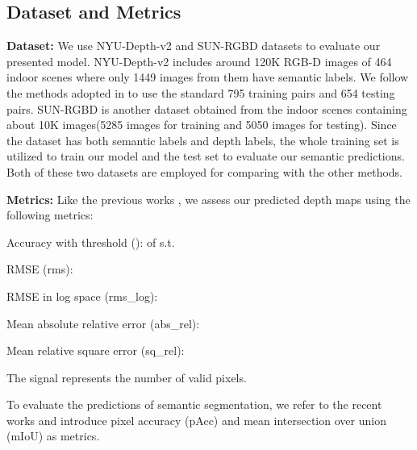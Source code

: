 \documentclass[sn-mathphys]{sn-jnl}
\theoremstyle{thmstyleone}\newtheorem{theorem}{Theorem}\newtheorem{proposition}[theorem]{Proposition}
\theoremstyle{thmstyletwo}\newtheorem{example}{Example}\newtheorem{remark}{Remark}
\theoremstyle{thmstylethree}\newtheorem{definition}{Definition}\usepackage[numbers,sort&compress]{natbib}
\begin{document}
\subsection{Dataset and Metrics}
\textbf{Dataset:} We use NYU-Depth-v2 \cite{Silberman_2012} and SUN-RGBD \cite{Song_2015} datasets to evaluate our presented model. NYU-Depth-v2 includes around 120K RGB-D images of 464 indoor scenes where only 1449 images from them have semantic labels. We follow the methods adopted in \cite{Jiao_2018,He_2021} to use the standard 795 training pairs and 654 testing pairs. SUN-RGBD is another dataset obtained from the indoor scenes containing about 10K images(5285 images for training and 5050 images for testing). Since the dataset has both semantic labels and depth labels, the whole training set is utilized to train our model and the test set to evaluate our semantic predictions. Both of these two datasets are employed for comparing with the other methods.

\textbf{Metrics:} Like the previous works \cite{eigen2014depth}, we assess our predicted depth maps using the following metrics:

Accuracy with threshold ():
 of  s.t. 

RMSE (rms): 

RMSE in log space (rms\_log): 

Mean absolute relative error (abs\_rel): 

Mean relative square error (sq\_rel): 

The signal  represents the number of valid pixels.

To evaluate the predictions of semantic segmentation, we refer to the recent works \cite{Yu_2020,Deng_2015} and introduce pixel accuracy (pAcc) and mean intersection over union (mIoU) as metrics.
\end{document}
